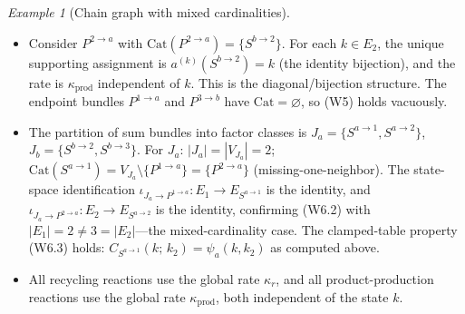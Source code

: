 \documentclass{article}
\theoremstyle{plain}
\theoremstyle{definition}
\theoremstyle{remark}
\newtheorem{example}{Example}[section]
\newcommand{\<}{\langle}
\renewcommand{\>}{\rangle}
\begin{document}
\begin{example}[Chain graph with mixed cardinalities]
\begin{itemize}
\item[(W5)] Consider $P^{2\to a}$ with $\mathrm{Cat}(P^{2\to a})=
  \{S^{b\to 2}\}$.  For each $k\in E_2$, the unique
  supporting assignment is $a^{(k)}(S^{b\to 2})=k$ (the identity
  bijection), and the rate is $\kappa_{\mathrm{prod}}$ independent
  of $k$.  This is the diagonal/bijection structure.
  The endpoint bundles $P^{1\to a}$ and $P^{3\to b}$ have
  $\mathrm{Cat}=\varnothing$, so (W5) holds vacuously.
 
\item[(W6)] The partition of sum bundles into factor classes is
  $J_a=\{S^{a\to 1}, S^{a\to 2}\}$,
  $J_b=\{S^{b\to 2}, S^{b\to 3}\}$.
  For $J_a$: $|J_a|=|V_{J_a}|=2$;
  $\mathrm{Cat}(S^{a\to 1})=V_{J_a}\setminus\{P^{1\to a}\}=
  \{P^{2\to a}\}$ (missing-one-neighbor).
  The state-space identification $\iota_{J_a\to P^{1\to a}}:
  E_1\to E_{S^{a\to 1}}$ is the identity, and
  $\iota_{J_a\to P^{2\to a}}: E_2\to E_{S^{a\to 2}}$ is the
  identity, confirming (W6.2) with $|E_1|=2\ne 3=|E_2|$---the
  mixed-cardinality case.
  The clamped-table property (W6.3) holds:
  $C_{S^{a\to 1}}(k;\, k_2) = \psi_a(k, k_2)$ as computed above.
 
\item[(R1)] All recycling reactions use the global rate $\kappa_r$,
  and all product-production reactions use the global rate
  $\kappa_{\mathrm{prod}}$, both independent of the state $k$.
\end{itemize}
 
 

\end{example}
\end{document}
